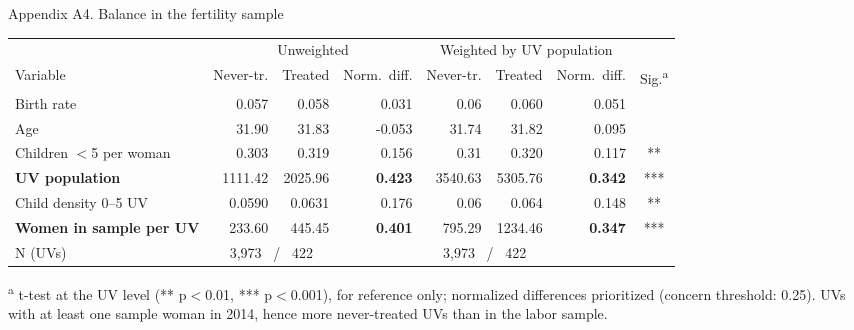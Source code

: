 \documentclass[aspectratio=169,10pt]{beamer}
\newcommand{\takeaway}[1]{\par\vspace{6pt}{\small\textcolor{steel}{$\Rightarrow$}\ \textbf{\textcolor{navy}{#1}}}}
\begin{document}
\begin{frame}{Appendix A4. Balance in the fertility sample}
\par
\vspace{2pt}
\begin{center}
\scriptsize
\renewcommand{\arraystretch}{0.95}
\setlength{\tabcolsep}{5pt}
\begin{tabular}{@{}lrrrrrrc@{}}
\toprule
 & \multicolumn{3}{c}{Unweighted} & \multicolumn{3}{c}{Weighted by UV population} & \\
\cmidrule(lr){2-4} \cmidrule(lr){5-7}
Variable & Never-tr. & Treated & Norm.\ diff. & Never-tr. & Treated & Norm.\ diff. & Sig.\textsuperscript{a} \\
\midrule
Birth rate            & 0.057 & 0.058 & 0.031 & 0.06 & 0.060 & 0.051 & \\
Age                   & 31.90 & 31.83 & -0.053 & 31.74 & 31.82 & 0.095 & \\
Children $<$5 per woman & 0.303 & 0.319 & 0.156 & 0.31 & 0.320 & 0.117 & ** \\
\textbf{UV population} & 1111.42 & 2025.96 & \textbf{0.423} & 3540.63 & 5305.76 & \textbf{0.342} & *** \\
Child density 0--5 UV & 0.0590 & 0.0631 & 0.176 & 0.06 & 0.064 & 0.148 & ** \\
\textbf{Women in sample per UV} & 233.60 & 445.45 & \textbf{0.401} & 795.29 & 1234.46 & \textbf{0.347} & *** \\
\midrule
N (UVs) & \multicolumn{2}{c}{3{,}973 \ / \ 422} & & \multicolumn{2}{c}{3{,}973 \ / \ 422} & & \\
\bottomrule
\end{tabular}
\end{center}
\vspace{-6pt}
{\tiny \textsuperscript{a} t-test at the UV level (** p$<$0.01, *** p$<$0.001), for reference only; normalized differences prioritized (concern threshold: 0.25). UVs with at least one sample woman in 2014, hence more never-treated UVs than in the labor sample.}
\takeaway{Same conclusion as the labor sample: women look alike, UVs differ in size.}
\end{frame}
\end{document}
